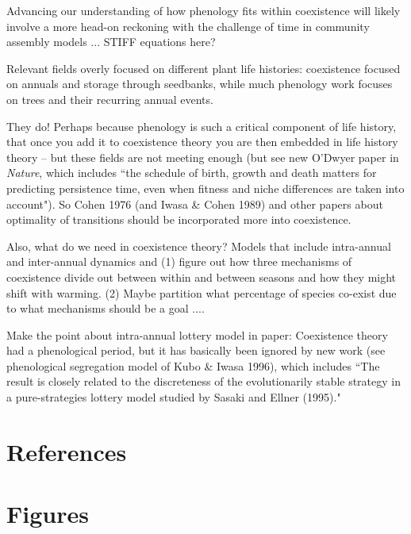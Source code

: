 \documentclass[11pt]{article}
\begin{document}
 Advancing our understanding of how phenology fits within coexistence will likely involve a more head-on reckoning with the challenge of time in community assembly models ... STIFF equations here? 


Relevant fields overly focused on different plant life histories: coexistence focused on annuals and storage through seedbanks, while much phenology work focuses on trees and their recurring annual events. 

They do! Perhaps because phenology is such a critical component of life history, that once you add it to coexistence theory you are then embedded in life history theory -- but these fields are not meeting enough (but see new O'Dwyer paper in \emph{Nature}, which includes ``the schedule of birth, growth and death matters for predicting persistence time, even when fitness and niche differences are taken into account"). So Cohen 1976 (and Iwasa \& Cohen 1989) and other papers about optimality of transitions should be incorporated more into coexistence. 

Also, what do we need in coexistence theory? Models that include intra-annual and inter-annual dynamics and (1) figure out how three mechanisms of coexistence divide out between within and between seasons and how they might shift with warming. (2) Maybe partition what percentage of species co-exist due to what mechanisms should be a goal .... 

Make the point about intra-annual lottery model in paper: Coexistence theory had a phenological period, but it has basically been ignored by new work (see phenological segregation model of Kubo \& Iwasa 1996), which includes ``The result is closely related to the discreteness of the evolutionarily stable strategy in a pure-strategies lottery model studied by Sasaki and Ellner (1995)." 

\newpage
\section{References}


\newpage
\section{Figures}
\end{document}
